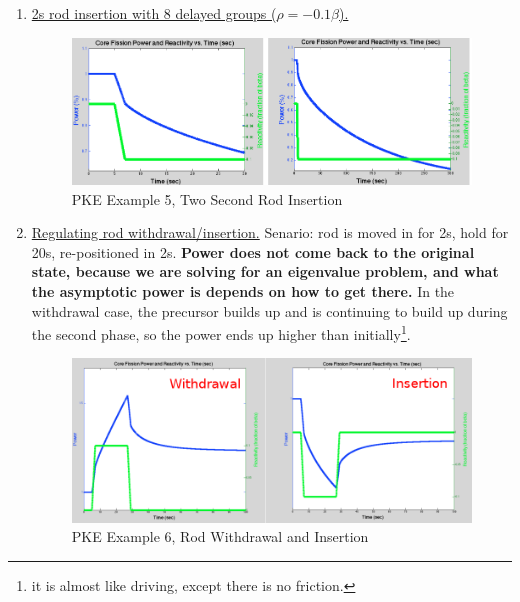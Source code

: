 \documentclass{school-22.211-notes}
\begin{document}
\begin{enumerate}
\item \uline{2s rod insertion with 8 delayed groups ($\rho = -0.1 \beta$).}
  \begin{figure}[ht]
    \centering
    \includegraphics[width=6in]{images/pke/ex5.png}
    \caption{PKE Example 5, Two Second Rod Insertion} 
  \end{figure}

\item \uline{Regulating rod withdrawal/insertion.} Senario: rod is moved in for 2s, hold for 20s, re-positioned in 2s. \textbf{Power does not come back to the original state, because we are solving for an eigenvalue problem, and what the asymptotic power is depends on how to get there.} In the withdrawal case, the precursor builds up and is continuing to build up during the second phase, so the power ends up higher than initially\footnote{it is almost like driving, except there is no friction.}.
  \begin{figure}[ht]
    \centering
    \includegraphics[width=6in]{images/pke/ex6.png}
    \caption{PKE Example 6, Rod Withdrawal and Insertion} 
  \end{figure}


\end{enumerate}
\end{document}
